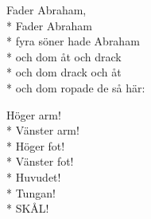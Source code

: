 \begin{SongText}
    \begin{SongVerse}
        Fader Abraham,\\*%
        Fader Abraham\\*%
        fyra söner hade Abraham\\*%
        och dom åt och drack\\*%
        och dom drack och åt\\*%
        och dom ropade de så här:
    \end{SongVerse}
    \begin{SongVerse}
        Höger arm!\\*%
        Vänster arm!\\*%
        Höger fot!\\*%
        Vänster fot!\\*%
        Huvudet!\\*%
        Tungan!\\*%
        SKÅL!
    \end{SongVerse}
\end{SongText}
